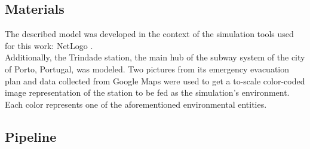 \subsection{Materials}

The described model was developed in the context of the simulation tools used for this work: NetLogo \cite{netlogo}. \\
Additionally, the Trindade station, the main hub of the subway system of the city of Porto, Portugal, was modeled. Two pictures from its emergency evacuation plan and data collected from Google Maps were used to get a to-scale color-coded image representation of the station to be fed as the simulation's environment. Each color represents one of the aforementioned environmental entities.

\newpage

\subsection{Pipeline}

